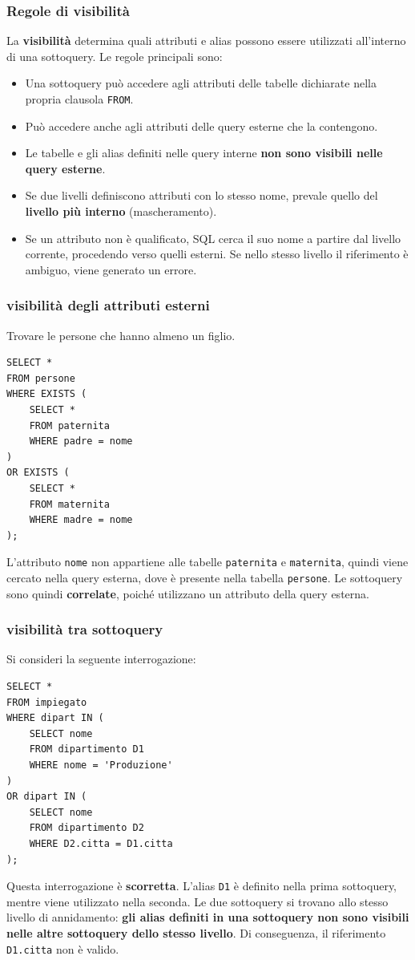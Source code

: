 \subsubsection*{Regole di visibilità}
La \textbf{visibilità} determina quali attributi e alias possono essere
utilizzati all'interno di una sottoquery.
Le regole principali sono:
\begin{itemize}
    \item Una sottoquery può accedere agli attributi delle tabelle
    dichiarate nella propria clausola \texttt{FROM}.
    
    \item Può accedere anche agli attributi delle query esterne
    che la contengono.
    
    \item Le tabelle e gli alias definiti nelle query interne
    \textbf{non sono visibili nelle query esterne}.
    
    \item Se due livelli definiscono attributi con lo stesso nome,
    prevale quello del \textbf{livello più interno} (mascheramento).
    
    \item Se un attributo non è qualificato, SQL cerca il suo nome
    a partire dal livello corrente, procedendo verso quelli esterni.
    Se nello stesso livello il riferimento è ambiguo, viene generato
    un errore.
\end{itemize}
\subsubsection*{visibilità degli attributi esterni}
Trovare le persone che hanno almeno un figlio.
\begin{verbatim}
SELECT *
FROM persone
WHERE EXISTS (
    SELECT *
    FROM paternita
    WHERE padre = nome
)
OR EXISTS (
    SELECT *
    FROM maternita
    WHERE madre = nome
);
\end{verbatim}
L'attributo \texttt{nome} non appartiene alle tabelle
\texttt{paternita} e \texttt{maternita}, quindi viene cercato
nella query esterna, dove è presente nella tabella \texttt{persone}.
Le sottoquery sono quindi \textbf{correlate}, poiché utilizzano
un attributo della query esterna.
\subsubsection*{visibilità tra sottoquery}
Si consideri la seguente interrogazione:
\begin{verbatim}
SELECT *
FROM impiegato
WHERE dipart IN (
    SELECT nome
    FROM dipartimento D1
    WHERE nome = 'Produzione'
)
OR dipart IN (
    SELECT nome
    FROM dipartimento D2
    WHERE D2.citta = D1.citta
);
\end{verbatim}
Questa interrogazione è \textbf{scorretta}.
L'alias \texttt{D1} è definito nella prima sottoquery,
mentre viene utilizzato nella seconda.
Le due sottoquery si trovano allo stesso livello di annidamento:
\textbf{gli alias definiti in una sottoquery non sono visibili
nelle altre sottoquery dello stesso livello}.
Di conseguenza, il riferimento \texttt{D1.citta} non è valido.

